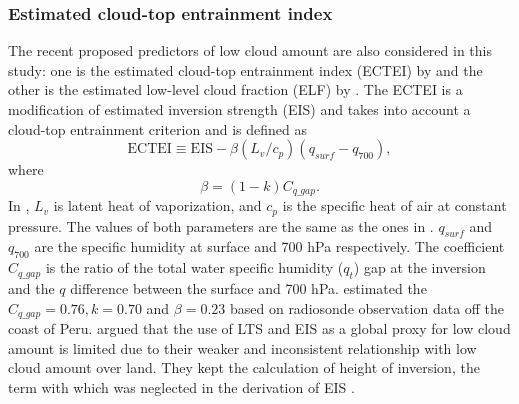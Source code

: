 \subsubsection{Estimated cloud-top entrainment index}

The recent proposed predictors of low cloud amount are also considered in this study: one is the estimated cloud-top entrainment index (ECTEI) by \cite{Kawai2017} and the other is the estimated low-level cloud fraction (ELF) by \cite{Park2019}. 
The ECTEI is a modification of estimated inversion strength (EIS) and takes into account a cloud-top entrainment criterion and is defined as
\begin{equation}
    \mathrm{ECTEI} \equiv \mathrm{EIS} - \beta\left(L_v / c_{p}\right)\left(q_{surf}-q_{700}\right),
    \label{eq:ectei_Kawai}
\end{equation}
where
\begin{equation}
    \beta=(1-k) C_{q\_gap}.
\end{equation}
In , $L_v$ is latent heat of vaporization, and $c_p$ is the specific heat of air at constant pressure. The values of both parameters are the same as the ones in  . $q_{surf}$ and $q_{700}$ are the specific humidity at surface and 700 hPa respectively. The coefficient $C_{q\_gap}$ is the ratio of the total water specific humidity ($q_t$) gap at
the inversion and the $q$ difference between the surface
and 700 hPa. \cite{Kawai2017} estimated the $C_{q\_gap} = 0.76, k=0.70 $ and $\beta = 0.23$ based on radiosonde observation data off the coast of Peru. 
\cite{Park2019} argued that the use of LTS and EIS as a global proxy for low cloud amount is limited due to their weaker and inconsistent relationship with low cloud amount over land. They kept the calculation of height of inversion, the term with which was neglected in the derivation of EIS \citep{Wood2006}.
